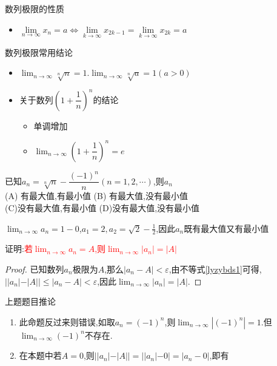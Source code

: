\documentclass[8pt a4paper, oneside, UTF8]{ctexbook}
\begin{document}
\begin{sloppypar}
\begin{criterion}{数列极限的性质}{}
\begin{itemize}
            \item $\underset{n\to\infty}{\operatorname*{\lim}}x_n=a\Leftrightarrow\underset{k\to\infty}{\operatorname*{\lim}}x_{2k-1}=\underset{k\to\infty}{\operatorname*{\lim}}x_{2k}=a$
        \end{itemize}
    \end{criterion}
    \begin{conclusion}{数列极限常用结论}{}
        \begin{itemize}
            \item \textbf{$\lim_{n \to \infty }\sqrt[n]{n}=1.\lim_{n \to \infty} \sqrt[n]{a}=1(a>0)$}\label{jl1}
            \item 关于数列$(1+\dfrac{1}{n})^n$的结论
            \begin{itemize}
                \item 单调增加
                \item $\lim_{n\to \infty}(1+\dfrac{1}{n})^n=e$
            \end{itemize}
        \end{itemize}
    \end{conclusion}
    \begin{problem}
        已知$a_{n}=\sqrt[n]{n}-\dfrac{(-1)^{n}}{n}(n=1,2,\cdots)$,则${a_n}$\\
        (A) 有最大值,有最小值 \quad (B) 有最大值,没有最小值 \\ (C)没有最大值,有最小值 \quad (D)没有最大值,没有最小值
    \end{problem}
    \begin{solution}
        $\lim_{n\to \infty}a_n=1-0$,$a_1=2,a_2=\sqrt{2}-\frac{1}{2}$,因此$a_n$既有最大值又有最小值
    \end{solution}
    \begin{problem}
        证明:\textcolor{red}{若$\lim_{n \to \infty}a_n=A$,则$\lim_{n \to \infty}|a_n|=|A|$}
    \end{problem}
    \begin{proof}
        已知数列$a_n$极限为$A$,那么$|a_n-A|<\varepsilon$,由不等式\ref{lyzybds1}可得,$||a_n|-|A||\leqslant|a_n -A|<\varepsilon$,因此$\lim_{n \to \infty }|a_n|=|A|$.
        \end{proof}
    \begin{corollary}{上题题目推论}{}
        \begin{enumerate}
            \item 此命题反过来则错误,如取$a_n=(-1)^n$,则$\lim_{n\to\infty}\left|(-1)^n\right|=1$.但$\lim_{n\to\infty}(-1)^n$不存在.
            \item 在本题中若$A=0$,则$||a_n|-|A||=||a_n|-0|=|a_n-0|$,即有

\end{enumerate}
\end{corollary}
\end{sloppypar}
\end{document}
